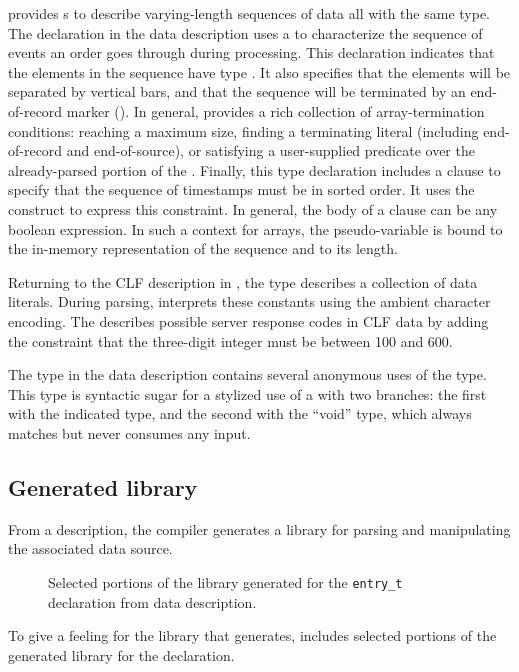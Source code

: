 \pads{} provides s to describe varying-length sequences of
data all with the same type.  The  declaration in the
\dibbler{} data description uses a  to characterize the
sequence of events an order goes through during processing.  This
declaration indicates that the elements in the sequence have type
.  It also specifies that the elements will be separated
by vertical bars, and that the sequence will be terminated by an
end-of-record marker ().  In general, \pads{} provides a rich
collection of array-termination conditions: reaching a maximum size,
finding a terminating literal (including end-of-record and
end-of-source), or satisfying a user-supplied predicate over the
already-parsed portion of the .  Finally, this type
declaration includes a  clause to specify that the sequence
of timestamps must be in sorted order.  It uses the 
construct to express this constraint.  In general, the body of a
 clause can be any boolean expression.  In such a context
for arrays, the pseudo-variable  is bound to the in-memory
representation of the sequence and  to its length.

Returning to the CLF description in , the
 type  describes a collection of data literals.
During parsing, \pads{} interprets these constants using the ambient
character encoding.  The   describes
possible server response codes in CLF data by adding the constraint
that the three-digit integer must be between 100 and 600.

The  type in the \dibbler{} data description
contains several anonymous uses of the  type.  This type is
syntactic sugar for a stylized use of a  with two branches:
the first with the indicated type, and the second with the ``void''
type, which always matches but never consumes any input.



\subsection{Generated library}
\label{sec:example:generated-library}
From a description, the \pads{} compiler generates a \C{} library
for parsing and manipulating the associated data source.  
\setcounter{totalnumber}{1}
\setcounter{dbltopnumber}{1}
\renewcommand{\topfraction}{0.85}
\renewcommand{\textfraction}{0.1}
\renewcommand{\floatpagefraction}{0.75}
\begin{figure*}
\begin{tiny}

\caption{Selected portions of the library generated for the \texttt{entry\_t}
  declaration from \dibbler{} data description.}
\label{figure:library}
\end{tiny}
\end{figure*}
To give a feeling for the library that \pads{} generates, 
 includes selected portions of the generated 
library for the \dibbler{}  declaration.


